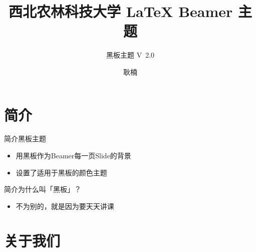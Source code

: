 \documentclass[t, aspectratio=169]{ctexbeamer}
\title[黑板主题]{\Large 西北农林科技大学 {\LaTeX}  Beamer 主题}%
\subtitle{黑板主题 V\ 2.0}%
\author[N. Geng]{耿楠}%
\date{\tosemester} %
\institute[智能媒体]{\cie} %
\begin{document}
\begin{frame}[plain]
  \maketitle
\end{frame}

\section{简介}
\begin{frame}{简介}{黑板主题}
  \begin{itemize}
  \item 用黑板作为Beamer每一页Slide的背景
  \item 设置了适用于黑板的颜色主题
  \end{itemize}
\end{frame}

\begin{frame}{简介}{为什么叫「黑板」？}
  \begin{itemize}
  \item 不为别的，就是因为要天天\alert{讲课}
  \end{itemize}
\end{frame}

\section[关于我们]{关于我们}
\end{document}
